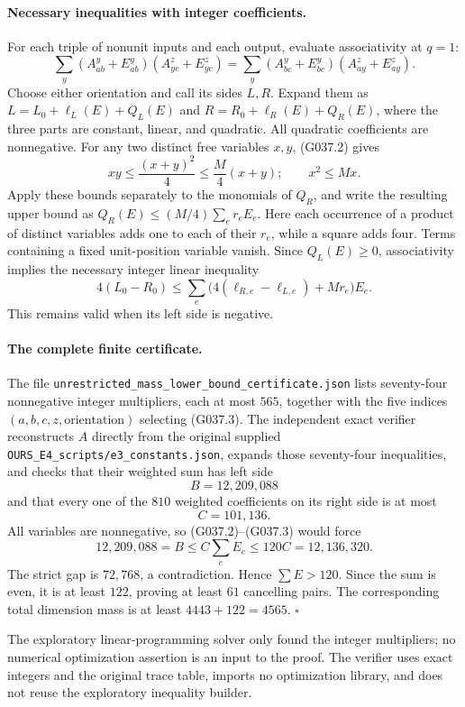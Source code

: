 \paragraph{Necessary inequalities with integer coefficients.}
For each triple of nonunit inputs and each output, evaluate
associativity at $q=1$:
\[
 \sum_y(A_{ab}^y+E_{ab}^y)(A_{yc}^z+E_{yc}^z)
 =
 \sum_y(A_{bc}^y+E_{bc}^y)(A_{ay}^z+E_{ay}^z).
\]
Choose either orientation and call its sides $L,R$.
Expand them as
$L=L_0+\ell_L(E)+Q_L(E)$ and
$R=R_0+\ell_R(E)+Q_R(E)$,
where the three parts are constant, linear, and quadratic.
All quadratic coefficients are nonnegative.
For any two distinct free variables $x,y$, (G037.2) gives
\[
 xy\le\frac{(x+y)^2}{4}\le\frac M4(x+y);
 \qquad x^2\le Mx.
\]
Apply these bounds separately to the monomials of $Q_R$,
and write the resulting upper bound as
$Q_R(E)\le(M/4)\sum_e r_eE_e$.
Here each occurrence of a product of distinct variables
adds one to each of their $r_e$, while a square adds four.
Terms containing a fixed unit-position variable vanish.
Since $Q_L(E)\ge0$, associativity implies the necessary
integer linear inequality
\[
 4(L_0-R_0)
 \le \sum_e
 \bigl(4(\ell_{R,e}-\ell_{L,e})+M r_e\bigr)E_e.       \tag{G037.3}
\]
This remains valid when its left side is negative.

\paragraph{The complete finite certificate.}
The file
\texttt{unrestricted\_mass\_lower\_bound\_certificate.json}
lists seventy-four nonnegative integer multipliers,
each at most $565$, together with the five indices
$(a,b,c,z,\text{orientation})$ selecting (G037.3).
The independent exact verifier reconstructs $A$ directly
from the original supplied
\texttt{OURS\_E4\_scripts/e3\_constants.json}, expands
those seventy-four inequalities, and checks that their
weighted sum has left side
\[
 B=12{,}209{,}088
\]
and that every one of the $810$ weighted coefficients
on its right side is at most
\[
 C=101{,}136.
\]
All variables are nonnegative, so (G037.2)--(G037.3)
would force
\[
 12{,}209{,}088=B
 \le C\sum_eE_e
 \le120C=12{,}136{,}320.
\]
The strict gap is $72{,}768$, a contradiction.
Hence $\sum E>120$. Since the sum is even, it is at
least $122$, proving at least $61$ cancelling pairs.
The corresponding total dimension mass is at least
$4443+122=4565$.
\hfill$\square$

The exploratory linear-programming solver only found the
integer multipliers; no numerical optimization assertion
is an input to the proof.
The verifier uses exact integers and the original trace
table, imports no optimization library, and does not
reuse the exploratory inequality builder.

